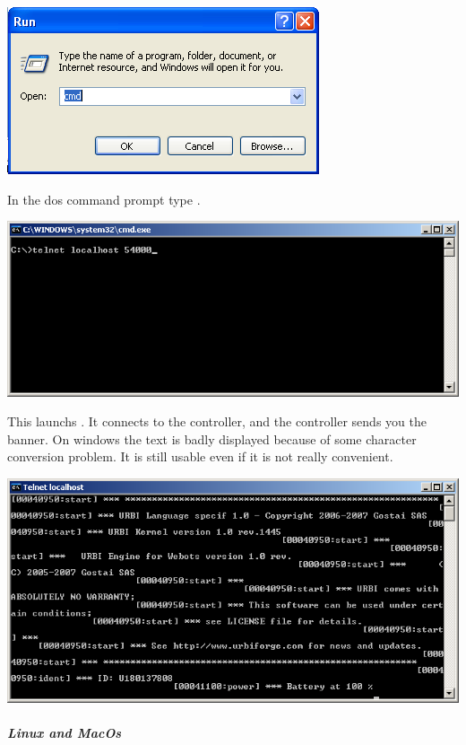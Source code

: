 \begin{center}
  \includegraphics{img/webots/run-cmd-windows}
\end{center}

In the dos command prompt type .

\begin{center}
  \includegraphics[width=.8\linewidth]{img/webots/telnet-windows}
\end{center}

This launchs . It connects to the \urbi controller,
and the \urbi controller sends you the \urbi banner. On windows the
text is badly displayed because of some character conversion
problem. It is still usable even if it is not really convenient.

\begin{center}
  \includegraphics[width=.8\linewidth]{img/webots/telnet-urbi-windows}
\end{center}

\subparagraph{Linux and MacOs}
\label{webots.firstrun.clientsoftware.telnet.linuxandmacos}%

